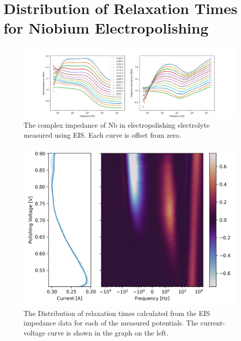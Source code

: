 \documentclass{revtex4-2}
\begin{document}
\section{Distribution of Relaxation Times for Niobium Electropolishing}



\begin{figure}[t]
  \label{fig:bodeplot}
  \includegraphics[width=\textwidth]{../figures/bodeplot.png}
  \caption{The complex impedance of Nb in electropolishing electrolyte measured using EIS. Each curve is offset from zero.}
\end{figure}

\begin{figure}[t]
  \label{fig:gamma}
  \includegraphics[width=\textwidth]{../figures/gamma.png}  
  \caption{The Distribution of relaxation times calculated from the EIS impedance data for each of the measured potentials. The current-voltage curve is shown in the graph on the left.}
\end{figure}
\end{document}
